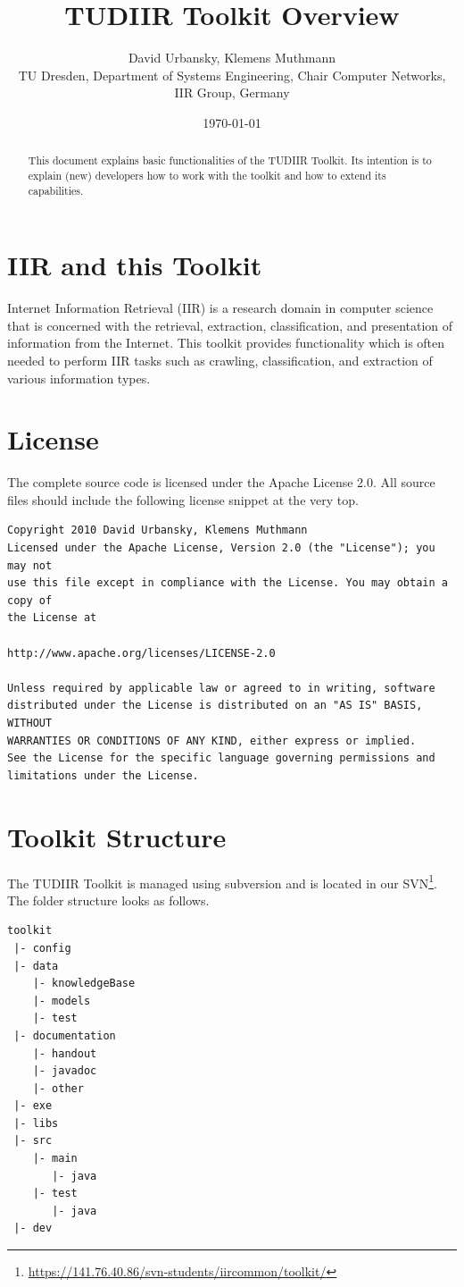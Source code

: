 \documentclass[a4paper,twoside]{article}      %
\date{\today}
\title{TUDIIR Toolkit Overview}
\author{David Urbansky, Klemens Muthmann \\
{\small TU Dresden, Department of Systems Engineering, Chair Computer Networks, IIR Group, Germany}
}
\begin{document}
\maketitle
\begin{abstract}
This document explains basic functionalities of the TUDIIR Toolkit. Its intention is to explain (new) developers how to work with the toolkit and how to extend its capabilities.
\end{abstract}

\tableofcontents

\section{IIR and this Toolkit}
Internet Information Retrieval (IIR) is a research domain in computer science that is concerned with the retrieval, extraction, classification, and presentation of information from the Internet. This toolkit provides functionality which is often needed to perform IIR tasks such as crawling, classification, and extraction of various information types.

\section{License}
The complete source code is licensed under the Apache License 2.0. All source files should include the following license snippet at the very top.

\begin{verbatim}
Copyright 2010 David Urbansky, Klemens Muthmann
Licensed under the Apache License, Version 2.0 (the "License"); you may not
use this file except in compliance with the License. You may obtain a copy of
the License at

http://www.apache.org/licenses/LICENSE-2.0

Unless required by applicable law or agreed to in writing, software
distributed under the License is distributed on an "AS IS" BASIS, WITHOUT
WARRANTIES OR CONDITIONS OF ANY KIND, either express or implied.
See the License for the specific language governing permissions and
limitations under the License.
\end{verbatim}


\section{Toolkit Structure}
\label{sec:toolkitstructure}
The TUDIIR Toolkit is managed using subversion and is located in our SVN\footnote{\url{https://141.76.40.86/svn-students/iircommon/toolkit/}}. The folder structure looks as follows.
\begin{verbatim}
toolkit
 |- config
 |- data
    |- knowledgeBase
    |- models
    |- test
 |- documentation
    |- handout
    |- javadoc
    |- other
 |- exe
 |- libs
 |- src
    |- main
       |- java
    |- test
       |- java
 |- dev
\end{verbatim}
\end{document}
